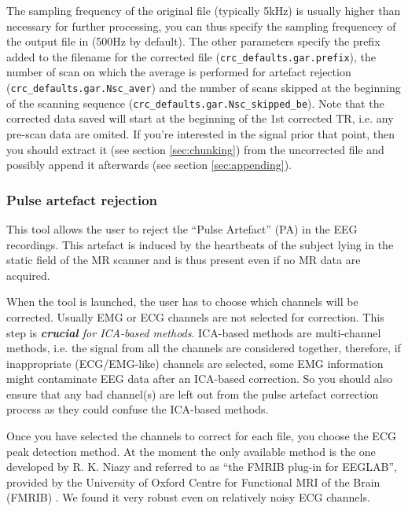 \documentclass[a4paper,titlepage]{article}
\begin{document}
The sampling frequency of the original file (typically 5kHz) is usually higher than necessary for further processing, you can thus specify the sampling frequencey of the output file in  (500Hz by default). The other parameters specify the prefix added to the filename for the corrected file ({\tt crc\_defaults.gar.prefix}), the number of scan on which the average is performed for artefact rejection ({\tt crc\_defaults.gar.Nsc\_aver}) and the number of scans skipped at the beginning of the scanning sequence \linebreak({\tt crc\_defaults.gar.Nsc\_skipped\_be}). Note that the corrected data saved will start at the beginning of the 1st corrected TR, i.e. any pre-scan data are omited. If you're interested in the signal prior that point, then you should extract it (see section \ref{sec:chunking}) from the uncorrected file and possibly append it afterwards (see section \ref{sec:appending}).

\subsubsection{Pulse artefact rejection}
\label{sec:par}
This tool allows the user to reject the ``Pulse Artefact'' (PA) in the EEG recordings. This artefact is induced by the heartbeats of the subject lying in the static field of the MR scanner and is thus present even if no MR data are acquired.

When the tool is launched, the user has to choose which channels will be corrected. Usually EMG or ECG channels are not selected for correction. This step is {\it {\bf crucial} for ICA-based methods}. ICA-based methods are multi-channel methods, i.e. the signal from all the channels are considered together, therefore, if inappropriate (ECG/EMG-like) channels are selected, some EMG information might contaminate EEG data after an ICA-based correction. So you should also ensure that any bad channel(s) are left out from the pulse artefact correction process as they could confuse the ICA-based methods.

Once you have selected the channels to correct for each file, you choose the ECG peak detection method. At the moment the only available method is the one developed by R. K. Niazy and referred to as ``the FMRIB plug-in for EEGLAB'', provided by the University of Oxford Centre for Functional MRI of the Brain (FMRIB) \cite{FMRIBplugin}. We found it very robust even on relatively noisy ECG channels.
\end{document}

